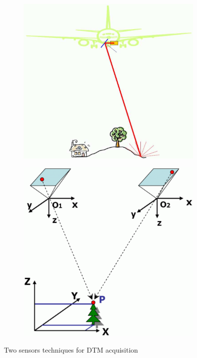 \begin{figure}
	\centering
	\begin{subfigure}{0.4\linewidth}
		\includegraphics[width=\textwidth]{figs/lidar.png}
		\label{fig:acqLidar}
	\end{subfigure}
	\quad
	\begin{subfigure}{0.4\linewidth}
		\includegraphics[width=\textwidth]{figs/photogrammetry.png}
		\label{fig:acqPhoto}
	\end{subfigure}
	\caption{Two sensors techniques for DTM acquisition}%
\label{fig:sensors}
\end{figure}

